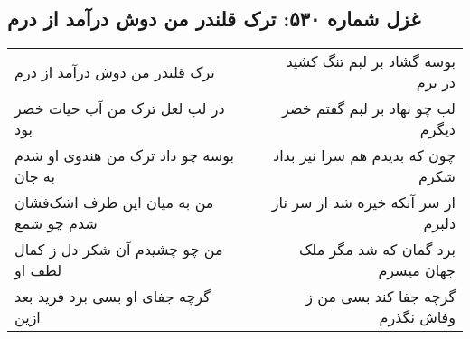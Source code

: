 \begin{center}
\section*{غزل شماره ۵۳۰: ترک قلندر من دوش درآمد از درم}
\label{sec:530}
\begin{longtable}{l p{0.5cm} r}
ترک قلندر من دوش درآمد از درم
&&
بوسه گشاد بر لبم تنگ کشید در برم
\\
در لب لعل ترک من آب حیات خضر بود
&&
لب چو نهاد بر لبم گفتم خضر دیگرم
\\
بوسه چو داد ترک من هندوی او شدم به جان
&&
چون که بدیدم هم سزا نیز بداد شکرم
\\
من به میان این طرف اشک‌فشان شدم چو شمع
&&
از سر آنکه خیره شد از سر ناز دلبرم
\\
من چو چشیدم آن شکر دل ز کمال لطف او
&&
برد گمان که شد مگر ملک جهان میسرم
\\
گرچه جفای او بسی برد فرید بعد ازین
&&
گرچه جفا کند بسی من ز وفاش نگذرم
\\
\end{longtable}
\end{center}

